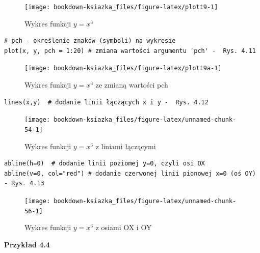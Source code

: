 \documentclass[12pt,B5paper,]{book}
\begin{document}
\begin{figure}[H]

{\centering \texttt{[image: bookdown-ksiazka\_files/figure-latex/plott9-1]} 

}

\caption{Wykres funkcji $y=x^3$}\label{fig:plott9}
\end{figure}

\begin{verbatim}
# pch - określenie znaków (symboli) na wykresie
plot(x, y, pch = 1:20) # zmiana wartości argumentu 'pch' -  Rys. 4.11
\end{verbatim}

\begin{figure}[H]

{\centering \texttt{[image: bookdown-ksiazka\_files/figure-latex/plott9a-1]} 

}

\caption{Wykres funkcji $y=x^3$ ze zmianą wartości pch}\label{fig:plott9a}
\end{figure}

\newpage

\begin{verbatim}
lines(x,y)  # dodanie linii łączących x i y -  Rys. 4.12
\end{verbatim}

\begin{figure}[H]

{\centering \texttt{[image: bookdown-ksiazka\_files/figure-latex/unnamed-chunk-54-1]} 

}

\caption{Wykres funkcji $y=x^3$ z liniami łączącymi}\label{fig:unnamed-chunk-54}
\end{figure}

\begin{verbatim}
abline(h=0)  # dodanie linii poziomej y=0, czyli osi OX
abline(v=0, col="red") # dodanie czerwonej linii pionowej x=0 (oś OY)  - Rys. 4.13
\end{verbatim}

\begin{figure}[H]

{\centering \texttt{[image: bookdown-ksiazka\_files/figure-latex/unnamed-chunk-56-1]} 

}

\caption{Wykres funkcji $y=x^3$ z osiami OX i OY}\label{fig:unnamed-chunk-56}
\end{figure}

\textbf{Przykład 4.4}
\end{document}
